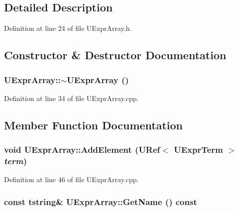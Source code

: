 \subsection{Detailed Description}


Definition at line 24 of file UExprArray.h.

\subsection{Constructor \& Destructor Documentation}
\hypertarget{class_u_expr_array_d00ea896c50c4aca1785fabdd56b1604}{
\subsubsection[{$\sim$UExprArray}]{\setlength{\rightskip}{0pt plus 5cm}UExprArray::$\sim$UExprArray ()}}
\label{class_u_expr_array_d00ea896c50c4aca1785fabdd56b1604}




Definition at line 34 of file UExprArray.cpp.

\subsection{Member Function Documentation}
\hypertarget{class_u_expr_array_fe206a8ac283eb69e123ba7cec9f52da}{
\subsubsection[{AddElement}]{\setlength{\rightskip}{0pt plus 5cm}void UExprArray::AddElement ({\bf URef}$<$ {\bf UExprTerm} $>$ {\em term})}}
\label{class_u_expr_array_fe206a8ac283eb69e123ba7cec9f52da}




Definition at line 46 of file UExprArray.cpp.\hypertarget{class_u_expr_array_c20f0a1422d0813f46d93b6920f2b026}{
\subsubsection[{GetName}]{\setlength{\rightskip}{0pt plus 5cm}const {\bf tstring}\& UExprArray::GetName () const}}
\label{class_u_expr_array_c20f0a1422d0813f46d93b6920f2b026}




